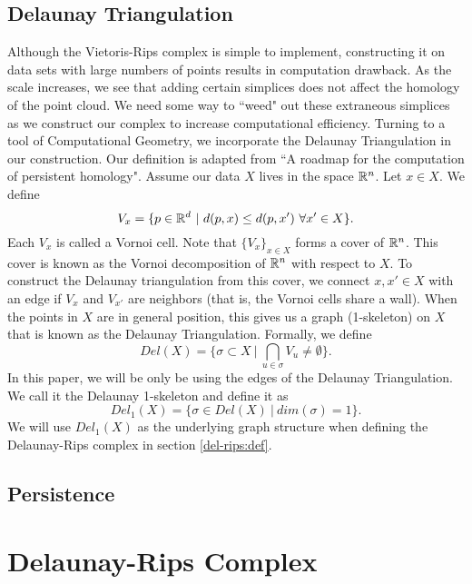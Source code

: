 \documentclass[letterpaper,titlepage]{article}
\begin{document}
\subsection{Delaunay Triangulation}
Although the Vietoris-Rips complex is simple to implement, constructing it on data sets with large numbers of points results in computation drawback. As the scale increases, we see that adding certain simplices does not affect the homology of the point cloud. We need some way to ``weed" out these extraneous simplices as we construct our complex to increase computational efficiency. Turning to a tool of Computational Geometry, we incorporate the Delaunay Triangulation in our construction. Our definition is adapted from ``A roadmap for the computation of persistent homology"\cite{roadmap}. Assume our data $X$ lives in the space $\mathbb{R}^n$. Let $x \in X$. We define
$$V_x = \{p \in \mathbb{R}^d\ |\ d(p,x) \leq d(p, x')\ \forall x' \in X\}.$$
Each $V_x$ is called a Vornoi cell. Note that $\{V_x\}_{x \in X}$ forms a cover of $\mathbb{R}^n$. This cover is known as the Vornoi decomposition of $\mathbb{R}^n$ with respect to $X$. To construct the Delaunay triangulation from this cover, we connect $x,x' \in X$ with an edge if $V_x$ and $V_{x'}$ are neighbors (that is, the Vornoi cells share a wall). When the points in $X$ are in general position, this gives us a graph (1-skeleton) on $X$ that is known as the Delaunay Triangulation. Formally, we define \cite{edelsbrunner}
$$Del(X) = \{\sigma \subset X\ |\ \bigcap_{u \in \sigma} V_u \neq \emptyset\}.$$
In this paper, we will be only be using the edges of the Delaunay Triangulation. We call it the Delaunay 1-skeleton and define it as
$$Del_{1}(X) = \{\sigma \in Del(X)\ |\ dim(\sigma) = 1\}.$$
We will use $Del_1(X)$ as the underlying graph structure when defining the Delaunay-Rips complex in section \ref{del-rips:def}.

\subsection{Persistence}


\section{Delaunay-Rips Complex}
\end{document}
